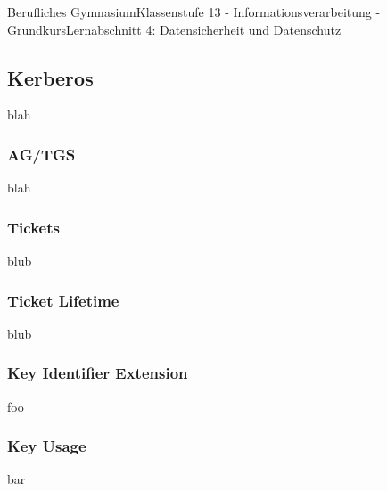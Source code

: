 \documentclass[11pt,oneside,openany,headings=optiontotoc,11pt,numbers=noenddot]{article}
\begin{document}
	\begin{worksheet}{Berufliches Gymnasium}{Klassenstufe 13 - Informationsverarbeitung - Grundkurs}{Lernabschnitt 4: Datensicherheit und Datenschutz}
		\setlength{\columnseprule}{0pt}
		\setcounter{section}{3}
		\setcounter{subsection}{3}
		\setcounter{page}{27}
		\subsection{Kerberos}
		blah
		\subsubsection{AG/TGS}
		blah
		\subsubsection{Tickets}
		blub
		\subsubsection{Ticket Lifetime}
		blub
		\subsubsection{Key Identifier Extension}
		foo
		\subsubsection{Key Usage}
		bar
	\end{worksheet}
\end{document}
